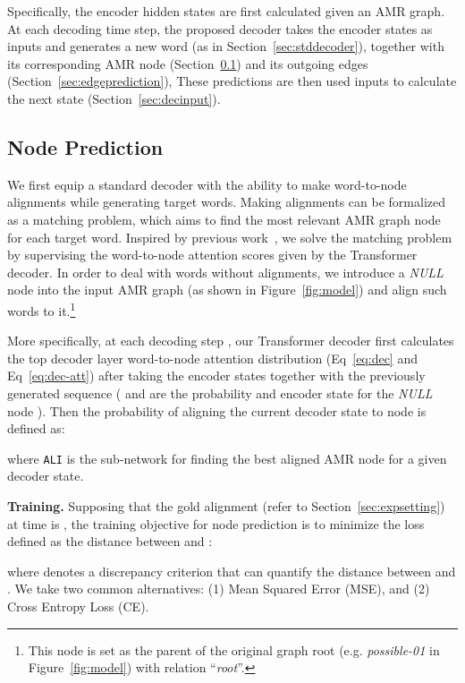 \documentclass[11pt,a4paper]{article}
\begin{document}
Specifically, the encoder hidden states are first calculated given an AMR graph.
At each decoding time step, the proposed decoder takes the encoder states
as inputs and generates a new word (as in Section~\ref{sec:stddecoder}), together with its corresponding AMR node (Section~\ref{sec:nodeprediction}) and its outgoing edges (Section~\ref{sec:edgeprediction}), 
These predictions are then used inputs to calculate the next state (Section~\ref{sec:decinput}).


\subsection{Node Prediction}
\label{sec:nodeprediction}
We first equip a standard decoder with the ability to make word-to-node alignments while generating target words.
Making alignments can be formalized as a matching problem, which aims to find the most relevant AMR graph node for each target word.
Inspired by previous work~\cite{liu-etal-2016-neural,mi-etal-2016-supervised}, we solve the matching problem by supervising the word-to-node attention scores given by the Transformer decoder.
In order to deal with words without alignments, we introduce a {\it NULL} node  into the input AMR graph (as shown in Figure~\ref{fig:model}) and align such words to it.\footnote{This node is set as the parent of the original graph root (e.g. {\it possible-01} in Figure~\ref{fig:model}) with relation ``\emph{root}''.}

More specifically, at each decoding step , our Transformer decoder first calculates the top decoder layer word-to-node attention distribution  (Eq~\ref{eq:dec} and Eq~\ref{eq:dec-att}) after taking the encoder states  together with the previously generated sequence  ( and  are the probability and encoder state for the {\it NULL} node ).
Then the probability of aligning the current decoder state to node  is defined as:

where \texttt{ALI} is the sub-network for finding the best aligned AMR node for a given decoder state.


\noindent\textbf{Training.}
Supposing that the gold alignment (refer to Section~\ref{sec:expsetting}) at time  is , the training objective for node prediction is to minimize the loss defined as the distance between  and :

where  denotes a discrepancy criterion that can quantify the distance between  and .
We take two common alternatives: (1) Mean Squared Error (MSE), and (2) Cross Entropy Loss (CE). 
\end{document}
